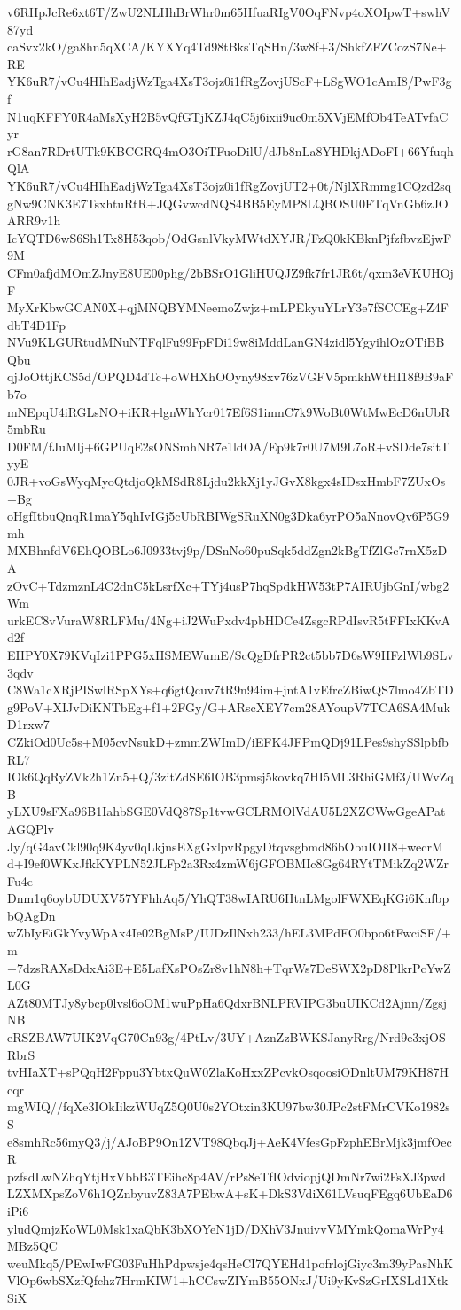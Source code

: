 v6RHpJcRe6xt6T/ZwU2NLHhBrWhr0m65HfuaRIgV0OqFNvp4oXOIpwT+swhV87yd
caSvx2kO/ga8hn5qXCA/KYXYq4Td98tBksTqSHn/3w8f+3/ShkfZFZCozS7Ne+RE
YK6uR7/vCu4HIhEadjWzTga4XsT3ojz0i1fRgZovjUScF+LSgWO1cAmI8/PwF3gf
N1uqKFFY0R4aMsXyH2B5vQfGTjKZJ4qC5j6ixii9uc0m5XVjEMfOb4TeATvfaCyr
rG8an7RDrtUTk9KBCGRQ4mO3OiTFuoDilU/dJb8nLa8YHDkjADoFI+66YfuqhQlA
YK6uR7/vCu4HIhEadjWzTga4XsT3ojz0i1fRgZovjUT2+0t/NjlXRmmg1CQzd2sq
gNw9CNK3E7TsxhtuRtR+JQGvwcdNQS4BB5EyMP8LQBOSU0FTqVnGb6zJOARR9v1h
IcYQTD6wS6Sh1Tx8H53qob/OdGsnlVkyMWtdXYJR/FzQ0kKBknPjfzfbvzEjwF9M
CFm0afjdMOmZJnyE8UE00phg/2bBSrO1GliHUQJZ9fk7fr1JR6t/qxm3eVKUHOjF
MyXrKbwGCAN0X+qjMNQBYMNeemoZwjz+mLPEkyuYLrY3e7fSCCEg+Z4FdbT4D1Fp
NVu9KLGURtudMNuNTFqlFu99FpFDi19w8iMddLanGN4zidl5YgyihlOzOTiBBQbu
qjJoOttjKCS5d/OPQD4dTc+oWHXhOOyny98xv76zVGFV5pmkhWtHI18f9B9aFb7o
mNEpqU4iRGLsNO+iKR+lgnWhYcr017Ef6S1imnC7k9WoBt0WtMwEcD6nUbR5mbRu
D0FM/fJuMlj+6GPUqE2sONSmhNR7e1ldOA/Ep9k7r0U7M9L7oR+vSDde7sitTyyE
0JR+voGsWyqMyoQtdjoQkMSdR8Ljdu2kkXj1yJGvX8kgx4sIDsxHmbF7ZUxOs+Bg
oHgfItbuQnqR1maY5qhIvIGj5cUbRBIWgSRuXN0g3Dka6yrPO5aNnovQv6P5G9mh
MXBhnfdV6EhQOBLo6J0933tvj9p/DSnNo60puSqk5ddZgn2kBgTfZlGc7rnX5zDA
zOvC+TdzmznL4C2dnC5kLsrfXc+TYj4usP7hqSpdkHW53tP7AIRUjbGnI/wbg2Wm
urkEC8vVuraW8RLFMu/4Ng+iJ2WuPxdv4pbHDCe4ZsgcRPdIsvR5tFFIxKKvAd2f
EHPY0X79KVqIzi1PPG5xHSMEWumE/ScQgDfrPR2ct5bb7D6sW9HFzlWb9SLv3qdv
C8Wa1cXRjPISwlRSpXYs+q6gtQcuv7tR9n94im+jntA1vEfrcZBiwQS7lmo4ZbTD
g9PoV+XIJvDiKNTbEg+f1+2FGy/G+ARscXEY7cm28AYoupV7TCA6SA4MukD1rxw7
CZkiOd0Uc5s+M05cvNsukD+zmmZWImD/iEFK4JFPmQDj91LPes9shySSlpbfbRL7
IOk6QqRyZVk2h1Zn5+Q/3zitZdSE6IOB3pmsj5kovkq7HI5ML3RhiGMf3/UWvZqB
yLXU9sFXa96B1IahbSGE0VdQ87Sp1tvwGCLRMOlVdAU5L2XZCWwGgeAPatAGQPlv
Jy/qG4avCkl90q9K4yv0qLkjnsEXgGxlpvRpgyDtqvsgbmd86bObuIOII8+wecrM
d+I9ef0WKxJfkKYPLN52JLFp2a3Rx4zmW6jGFOBMIc8Gg64RYtTMikZq2WZrFu4c
Dnm1q6oybUDUXV57YFhhAq5/YhQT38wIARU6HtnLMgolFWXEqKGi6KnfbpbQAgDn
wZbIyEiGkYvyWpAx4Ie02BgMsP/IUDzIlNxh233/hEL3MPdFO0bpo6tFwciSF/+m
+7dzsRAXsDdxAi3E+E5LafXsPOsZr8v1hN8h+TqrWs7DeSWX2pD8PlkrPcYwZL0G
AZt80MTJy8ybcp0lvsl6oOM1wuPpHa6QdxrBNLPRVIPG3buUIKCd2Ajnn/ZgsjNB
eRSZBAW7UIK2VqG70Cn93g/4PtLv/3UY+AznZzBWKSJanyRrg/Nrd9e3xjOSRbrS
tvHIaXT+sPQqH2Fppu3YbtxQuW0ZlaKoHxxZPcvkOsqoosiODnltUM79KH87Hcqr
mgWIQ//fqXe3IOkIikzWUqZ5Q0U0s2YOtxin3KU97bw30JPc2stFMrCVKo1982sS
e8smhRc56myQ3/j/AJoBP9On1ZVT98QbqJj+AeK4VfesGpFzphEBrMjk3jmfOecR
pzfsdLwNZhqYtjHxVbbB3TEihc8p4AV/rPs8eTfIOdviopjQDmNr7wi2FsXJ3pwd
LZXMXpsZoV6h1QZnbyuvZ83A7PEbwA+sK+DkS3VdiX61LVsuqFEgq6UbEaD6iPi6
yludQmjzKoWL0Msk1xaQbK3bXOYeN1jD/DXhV3JnuivvVMYmkQomaWrPy4MBz5QC
weuMkq5/PEwIwFG03FuHhPdpwsje4qsHeCI7QYEHd1pofrlojGiyc3m39yPasNhK
VlOp6wbSXzfQfchz7HrmKIW1+hCCswZIYmB55ONxJ/Ui9yKvSzGrIXSLd1XtkSiX
